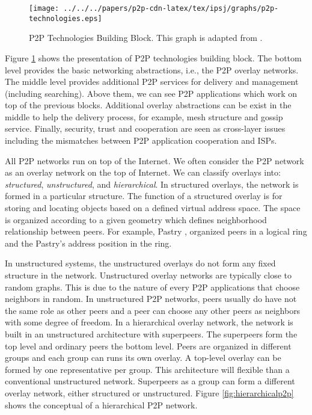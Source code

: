 \begin{figure}[tb]
\begin{center}
\texttt{[image: ../../../papers/p2p-cdn-latex/tex/ipsj/graphs/p2p-technologies.eps]}
\end{center}
\caption{P2P Technologies Building Block. This graph is adapted from \cite{Passarella20121}.} 
\label{fig:p2ptech}
\end{figure}

Figure \ref{fig:p2ptech} shows the presentation of P2P technologies building block.
The bottom level provides the basic networking abstractions, i.e., the P2P overlay networks. 
The middle level provides additional P2P services for delivery and management (including searching).
Above them, we can see P2P applications which work on top of the previous blocks.
Additional overlay abstractions can be exist in the middle to help the delivery process, for example,  mesh structure and gossip service.
Finally, security, trust and cooperation are seen as cross-layer issues including the mismatches between P2P application cooperation and ISPs.

All P2P networks run on top of the Internet. 
We often consider the P2P network as an overlay network on the top of Internet. 
We can classify overlays into: \emph{structured}, \emph{unstructured}, and \emph{hierarchical}. 
In structured overlays, the network is formed in a particular structure. 
The function of a structured overlay is for storing and locating objects based on a defined virtual address space. 
The space is organized according to a given geometry which defines neighborhood relationship between peers.
For example, Pastry \cite{Rowstron:2001:PSD:646591.697650}, organized peers in a logical ring and the Pastry's address position in the ring. 

In unstructured systems, the unstructured overlays do not form any fixed structure in the network. 
Unstructured overlay networks are typically close to random graphs. 
This is due to the nature of every P2P applications that choose neighbors in random.
In unstructured P2P networks, peers usually do have not the same role as other peers and a peer can choose any other peers as neighbors with some degree of freedom.  
In a hierarchical overlay network, the network is built in an unstructured architecture with superpeers.
The superpeers form the top level and ordinary peers the bottom level.
Peers are organized in different groups and each group can runs its own overlay. 
A top-level overlay can be formed by one representative per group.
This architecture will flexible than a conventional unstructured network. 
Superpeers as a group can form a different overlay network, either structured or unstructured. 
Figure \ref{fig:hierarchicalp2p} shows the conceptual of a hierarchical P2P network. 

